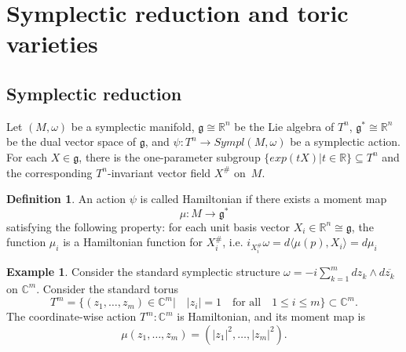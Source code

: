 \documentclass[jsg]{IP_v1_forauthors}
\def\leq{\leqslant}
\theoremstyle{definition}
\newtheorem{defi}[theo]{Definition}
\newtheorem{rema}[theo]{Remark}
\numberwithin{equation}{section}
\newtheorem{exam}{Example}
\begin{document}
\section{Symplectic reduction and toric varieties}

\subsection{Symplectic reduction}

Let $(M,\omega)$ be a symplectic manifold, $\mathfrak{g} \cong {\mathbb R}^n$ be the Lie algebra of $T^n$, $\mathfrak{g}^* \cong {\mathbb R}^n$ be the dual vector space of $\mathfrak{g}$, and
$\psi : T^n \rightarrow Sympl(M,\omega)$ be a symplectic action. For each $X  \in \mathfrak{g}$, there is the one-parameter subgroup $\{exp(t X) | t \in {\mathbb R}\} \subseteq T^n$ and the corresponding $T^n$-invariant vector field $X^\#$ on~$M$.

\begin{defi}
An action $\psi$ is called Hamiltonian if there exists a moment map
\begin{equation}
\mu : M \rightarrow \mathfrak{g}^*
\end{equation}
satisfying the following property: for each unit basis vector $X_i \in {\mathbb R}^n \cong \mathfrak{g}$, the function $\mu_i$ is a Hamiltonian function for $X_i^\#$, i.e. $i_{X_i^\#}\omega=d \langle \mu (p), X_i \rangle = d \mu_i$
\end{defi}


\begin{exam}
Consider the standard symplectic structure $\omega= - i \sum_{k=1}^m dz_k \wedge d\overline{z_k}$ on ${\mathbb C}^m$. %
Consider the standard torus
\begin{equation}
T^m=\{ (z_1,\ldots,z_m ) \in {\mathbb C}^m | \quad |z_i|=1 \quad \text{for all} \quad 1 \leq i \leq m\} \subset {\mathbb C}^m.
\end{equation}
The coordinate-wise action $T^m:{\mathbb C}^m$ is Hamiltonian, and its moment map is
\begin{equation} 
\mu(z_1,\ldots,z_m)=(|z_1|^2,\ldots,|z_m|^2).
\end{equation}

\end{exam}
\end{document}
